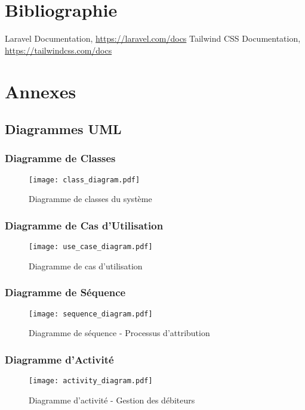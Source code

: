 \documentclass[12pt,a4paper]{report}
\begin{document}
\chapter{Bibliographie}
\begin{thebibliography}{9}
     Laravel Documentation, \url{https://laravel.com/docs}
     Tailwind CSS Documentation, \url{https://tailwindcss.com/docs}
\end{thebibliography}

\appendix
\chapter{Annexes}
\section{Diagrammes UML}
\subsection{Diagramme de Classes}
\begin{figure}[H]
    \centering
    \texttt{[image: class\_diagram.pdf]}
    \caption{Diagramme de classes du système}
    \label{fig:class_diagram}
\end{figure}

\subsection{Diagramme de Cas d'Utilisation}
\begin{figure}[H]
    \centering
    \texttt{[image: use\_case\_diagram.pdf]}
    \caption{Diagramme de cas d'utilisation}
    \label{fig:use_case_diagram}
\end{figure}

\subsection{Diagramme de Séquence}
\begin{figure}[H]
    \centering
    \texttt{[image: sequence\_diagram.pdf]}
    \caption{Diagramme de séquence - Processus d'attribution}
    \label{fig:sequence_diagram}
\end{figure}

\subsection{Diagramme d'Activité}
\begin{figure}[H]
    \centering
    \texttt{[image: activity\_diagram.pdf]}
    \caption{Diagramme d'activité - Gestion des débiteurs}
    \label{fig:activity_diagram}
\end{figure}
\end{document}
